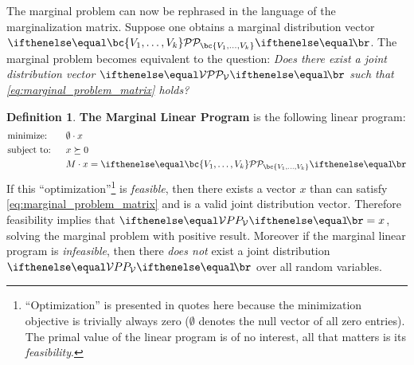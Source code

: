 \documentclass[aps, 10pt, english, twoside, pra, nofootinbib, longbibliography]{revtex4-1}
\theoremstyle{plain}
\theoremstyle{definition}
\newtheorem{definition}[theorem]{Definition}
\theoremstyle{remark}
\newcommand{\term}[1]{\textcolor{Mahogany}{\textbf{#1}}}
\begin{document}
    The marginal problem can now be rephrased in the language of the marginalization matrix. Suppose one obtains a marginal distribution vector $\probvec[\bc{V_1, \ldots, V_k}]$. The marginal problem becomes equivalent to the question: \textit{Does there exist a joint distribution vector $\probvec[\mathcal{V}]$ such that \cref{eq:marginal_problem_matrix} holds?}

    \begin{definition}
        \label{def:marginal_linear_program}
        \term{The Marginal Linear Program} is the following linear program:
        \begin{alignat*}{2}
            & \text{minimize:} \quad&& \emptyset \cdot x\\
            & \text{subject to:} && x \succeq 0 \\
            & && M \cdot x = \probvec[\bc{V_1, \ldots, V_k}]
        \end{alignat*}
        If this ``optimization''\footnote{``Optimization'' is presented in quotes here because the minimization objective is trivially always zero ($\emptyset$ denotes the null vector of all zero entries). The primal value of the linear program is of no interest, all that matters is its \textit{feasibility}.} is \textit{feasible}, then there exists a vector $x$ than can satisfy \cref{eq:marginal_problem_matrix} and is a valid joint distribution vector. Therefore feasibility implies that $\prob[\mathcal{V}] = x$, solving the marginal problem with positive result. Moreover if the marginal linear program is \textit{infeasible}, then there \textit{does not} exist a joint distribution $\prob[\mathcal{V}]$ over all random variables.
    \end{definition}
\end{document}
